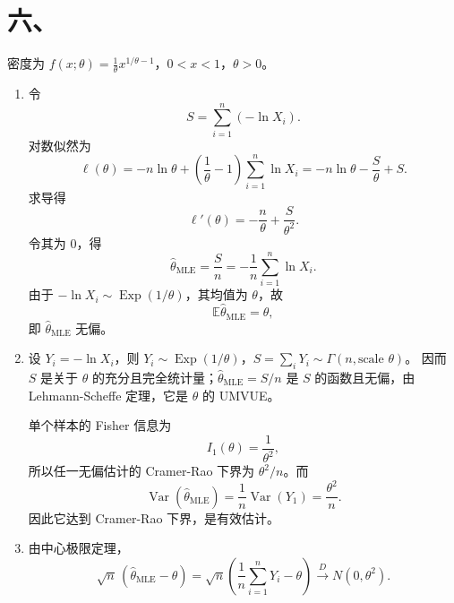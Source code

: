 \documentclass[UTF8,zihao=-4,fontset=windows]{ctexart}
\newcommand{\EX}{\mathbb E}
\newcommand{\Var}{\operatorname{Var}}
\begin{document}
\section*{六、}
密度为 $f(x;\theta)=\frac1\theta x^{1/\theta-1}$，$0<x<1$，$\theta>0$。

\begin{enumerate}
  \item 令
  \[
    S=\sum_{i=1}^n(-\ln X_i).
  \]
  对数似然为
  \[
    \ell(\theta)=-n\ln\theta+\left(\frac1\theta-1\right)\sum_{i=1}^n\ln X_i
    =-n\ln\theta-\frac{S}{\theta}+S.
  \]
  求导得
  \[
    \ell'(\theta)=-\frac n\theta+\frac{S}{\theta^2}.
  \]
  令其为 $0$，得
  \[
    \hat\theta_{\mathrm{MLE}}=\frac{S}{n}
    =-\frac1n\sum_{i=1}^n\ln X_i.
  \]
  由于 $-\ln X_i\sim \operatorname{Exp}(1/\theta)$，其均值为 $\theta$，故
  \[
    \EX\hat\theta_{\mathrm{MLE}}=\theta,
  \]
  即 $\hat\theta_{\mathrm{MLE}}$ 无偏。

  \item 设 $Y_i=-\ln X_i$，则 $Y_i\sim \operatorname{Exp}(1/\theta)$，$S=\sum_iY_i\sim \Gamma(n,\text{scale } \theta)$。
  因而 $S$ 是关于 $\theta$ 的充分且完全统计量；$\hat\theta_{\mathrm{MLE}}=S/n$ 是 $S$ 的函数且无偏，由 Lehmann-Scheffe 定理，它是 $\theta$ 的 UMVUE。

  单个样本的 Fisher 信息为
  \[
    I_1(\theta)=\frac1{\theta^2},
  \]
  所以任一无偏估计的 Cramer-Rao 下界为 $\theta^2/n$。而
  \[
    \Var(\hat\theta_{\mathrm{MLE}})
    =\frac{1}{n}\Var(Y_1)
    =\frac{\theta^2}{n}.
  \]
  因此它达到 Cramer-Rao 下界，是有效估计。

  \item 由中心极限定理，
  \[
    \sqrt n\,(\hat\theta_{\mathrm{MLE}}-\theta)
    =\sqrt n\left(\frac1n\sum_{i=1}^n Y_i-\theta\right)
    \xrightarrow{D} N(0,\theta^2).
  \]
\end{enumerate}
\end{document}
